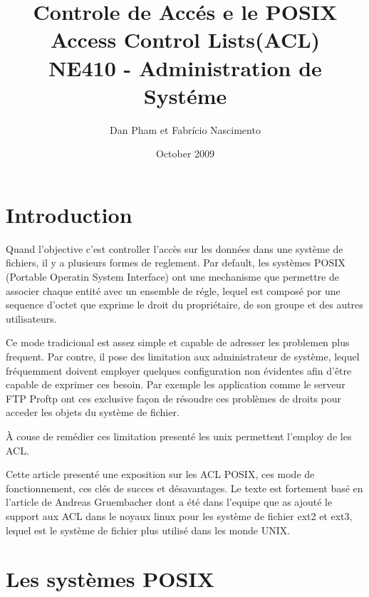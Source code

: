 \documentclass[draft]{article}
\title{\textbf{Controle de Accés e le POSIX Access Control Lists(ACL)} \\ NE410 - Administration de Systéme }
\author{Dan Pham et Fabrício Nascimento}
\date{October 2009}
\begin{document}
\maketitle
\newpage
\section*{Introduction}

Quand l'objective c'est controller l'accès sur les données dans une système de fichiers, il y a plusieurs formes de reglement. Par default, les systèmes POSIX (Portable Operatin System Interface)\cite{ieee1,ieee2} ont une mechanisme que permettre de associer chaque entité avec un ensemble de régle, lequel est composé por une sequence d'octet que exprime le droit du propriétaire, de son groupe et des autres utilisateurs. 

Ce mode tradicional est assez simple et capable de adresser les problemen plus frequent. Par contre, il pose des limitation aux administrateur de système, lequel fréquemment doivent employer quelques configuration non évidentes afin d'être capable de exprimer ces besoin. Par exemple les application comme le serveur FTP Proftp\cite{ftp} ont ces exclusive façon de résoudre ces problèmes de droits pour acceder les objets du système de fichier.

À couse de remédier ces limitation presenté les unix permettent l'employ de les ACL.   

Cette article presenté une exposition sur les ACL POSIX, ces mode de fonctionnement, ces clés de succes et désavantages. Le texte est fortement basé en l'article de Andreas Gruembacher\cite{aclsuse} dont a été dans l'equipe que as ajouté le support aux ACL dans le noyaux linux pour les système de fichier ext2 et ext3, lequel est le système de fichier plus utilisé dans les monde UNIX.

\section*{Les systèmes POSIX}

% 
\end{document}
